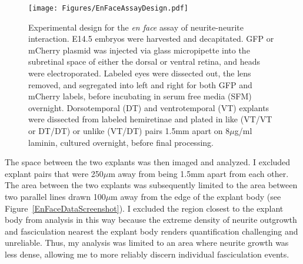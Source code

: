 \begin{figure}[hbtp]
    \begin{center}
        \texttt{[image: Figures/EnFaceAssayDesign.pdf]}
        \caption[Experimental design for the \emph{en face} assay of neurite-neurite interaction.]
        {Experimental design for the \emph{en face} assay of neurite-neurite interaction.
        E14.5 embryos were harvested and decapitated.
        GFP or mCherry plasmid was injected via glass micropipette into the subretinal space of either the dorsal or ventral retina, and heads were electroporated.
        Labeled eyes were dissected out, the lens removed, and segregated into left and right for both GFP and mCherry labels, before incubating in serum free media (SFM) overnight.
        Dorsotemporal (DT) and ventrotemporal (VT) explants were dissected from labeled hemiretinae and plated in like (VT/VT or DT/DT) or unlike (VT/DT) pairs 1.5mm apart on 8$\mu$g/ml laminin, cultured overnight, before final processing.
        }
        \label{Figures/EnFaceAssayDesign}
    \end{center}
\end{figure}
The space between the two explants was then imaged and analyzed.
I excluded explant pairs that were \pm{} 250$\mu$m away from being 1.5mm apart from each other.
The area between the two explants was subsequently limited to the area between two parallel lines drawn 100$\mu$m away from the edge of the explant body (see Figure~\ref{EnFaceDataScreenshot}).
I excluded the region closest to the explant body from analysis in this way because the extreme density of neurite outgrowth and fasciculation nearest the explant body renders quantification challenging and unreliable.
Thus, my analysis was limited to an area where neurite growth was less dense, allowing me to more reliably discern individual fasciculation events.
